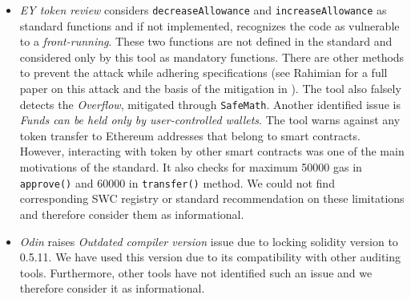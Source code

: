 \begin{itemize}[noitemsep,topsep=0pt]
	\item \textit{EY token review} considers \texttt{decreaseAllowance} and \texttt{increaseAllowance} as standard \erc functions and if not implemented, recognizes the code as vulnerable to a \textit{front-running}. These two functions are not defined in the \erc standard\cite{ERC20Std} and considered only by this tool as mandatory functions. There are other methods to prevent the attack while adhering \erc specifications (see Rahimian \etal for a full paper on this attack and the basis of the mitigation in \sys\cite{ERC20MWA}). The tool also falsely detects the \textit{Overflow}, mitigated through \texttt{SafeMath}. Another identified issue is \textit{Funds can be held only by user-controlled wallets}. The tool warns against any token transfer to Ethereum addresses that belong to smart contracts. However, interacting with \erc token by other smart contracts was one of the main motivations of the standard. It also checks for maximum 50000 gas in \texttt{approve()} and 60000 in \texttt{transfer()} method. We could not find corresponding SWC registry or standard recommendation on these limitations and therefore consider them as informational.

	\item \textit{Odin} raises \textit{Outdated compiler version} issue due to locking solidity version to 0.5.11. We have used this version due to its compatibility with other auditing tools. Furthermore, other tools have not identified such an issue and we therefore consider it as informational.
\end{itemize}

